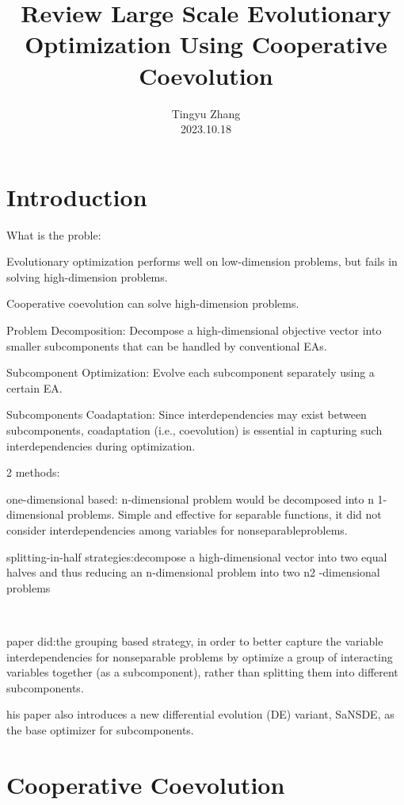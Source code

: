 \documentclass{article}
\newcommand{\tmaffiliation}[1]{\\ #1}
\begin{document}
\title{Review Large Scale Evolutionary Optimization Using Cooperative
Coevolution}

\author{
  Tingyu Zhang
  \tmaffiliation{2023.10.18}
}

\maketitle

\section{Introduction}

What is the proble:

Evolutionary optimization performs {\color[HTML]{FFAAFF}well on low-dimension
problems}, but{\color[HTML]{FFAAFF} fails in solving high-dimension problems}.

Cooperative coevolution can solve high-dimension problems.

Problem Decomposition: Decompose a high-dimensional objective vector into
smaller subcomponents that can be handled by conventional EAs.

Subcomponent Optimization: Evolve each subcomponent separately using a
certain EA.

Subcomponents Coadaptation: Since interdependencies may exist between
subcomponents, coadaptation (i.e., coevolution) is essential in capturing such
interdependencies during optimization.

2 methods: \

one-dimensional based: n-dimensional problem would be decomposed into n
1-dimensional problems. Simple and effective for separable functions, it did
not consider interdependencies among variables for nonseparableproblems.

splitting-in-half strategies:decompose a high-dimensional vector into two
equal halves and thus reducing an n-dimensional problem into two n2
-dimensional problems

\

paper did:the grouping based strategy, in order to better capture the
variable interdependencies for nonseparable problems by optimize a group of
interacting variables together (as a subcomponent), rather than splitting them
into different subcomponents.

his paper also introduces a new differential evolution (DE) variant, SaNSDE,
as the base optimizer for subcomponents.

\section{Cooperative Coevolution}
\end{document}
